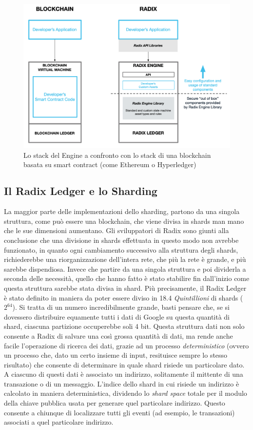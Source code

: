 \begin{figure}[H]
    \includegraphics[width=\linewidth]{images/radix-engine-2.png}
    \caption{Lo stack del Engine a confronto con lo stack di una blockchain basata su smart contract (come Ethereum o Hyperledger)}
    \label{fig:my_label}
\end{figure}

\subsection{Il Radix Ledger e lo Sharding}

La maggior parte delle implementazioni dello sharding, partono da una singola struttura, come può essere una blockchain, che viene divisa in shards man mano che le sue dimensioni aumentano. Gli sviluppatori di Radix sono giunti alla conclusione che una divisione in shards effettuata in questo modo non avrebbe funzionato, in quanto ogni cambiamento successivo alla struttura degli shards, richiederebbe una riorganizzazione dell'intera rete, che più la rete è grande, e più sarebbe dispendiosa. Invece che partire da una singola struttura e poi dividerla a seconda delle necessità, quello che hanno fatto è stato stabilire fin dall'inizio come questa struttura sarebbe stata divisa in shard. 
Più precisamente, il Radix Ledger è stato definito in maniera da poter essere diviso in 18.4 \textit{Quintillioni} di shards ($2^{64}$). Si tratta di un numero incredibilmente grande, basti pensare che, se si dovessero distribuire equamente tutti i dati di Google su questa quantità di shard, ciascuna partizione occuperebbe soli 4 bit. Questa struttura dati non solo consente a Radix di salvare una così grossa quantità di dati, ma rende anche facile l'operazione di ricerca dei dati, grazie ad un processo \textit{deterministico} (ovvero un processo che, dato un certo insieme di input, resituisce sempre lo stesso risultato) che consente di determinare in quale shard risiede un particolare dato. A ciascuno di questi dati è associato un indirizzo, solitamente il mittente di una transazione o di un messaggio. L'indice dello shard in cui risiede un indirizzo è calcolato in maniera deterministica, dividendo lo \textit{shard space} totale per il modulo della chiave pubblica usata per generare quel particolare indirizzo. Questo consente a chiunque di localizzare tutti gli eventi (ad esempio, le transazioni) associati a quel particolare indirizzo. 

